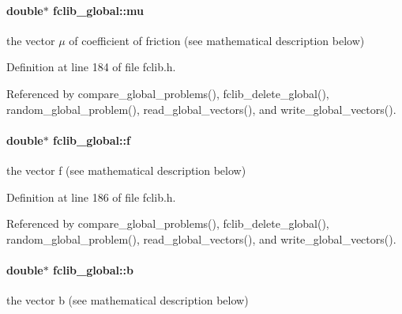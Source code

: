 \hypertarget{structfclib__global_a99fd8c775c35a6a0e233df1f8cae181a}{}
\paragraph[{mu}]{\setlength{\rightskip}{0pt plus 5cm}double$\ast$ fclib\+\_\+global\+::mu}\label{structfclib__global_a99fd8c775c35a6a0e233df1f8cae181a}


the vector $\mu$ of coefficient of friction (see mathematical description below) 



Definition at line 184 of file fclib.\+h.



Referenced by compare\+\_\+global\+\_\+problems(), fclib\+\_\+delete\+\_\+global(), random\+\_\+global\+\_\+problem(), read\+\_\+global\+\_\+vectors(), and write\+\_\+global\+\_\+vectors().

\hypertarget{structfclib__global_a6d5d0d1f9169b886eb3d3aca0632e8a9}{}
\paragraph[{f}]{\setlength{\rightskip}{0pt plus 5cm}double$\ast$ fclib\+\_\+global\+::f}\label{structfclib__global_a6d5d0d1f9169b886eb3d3aca0632e8a9}


the vector f (see mathematical description below) 



Definition at line 186 of file fclib.\+h.



Referenced by compare\+\_\+global\+\_\+problems(), fclib\+\_\+delete\+\_\+global(), random\+\_\+global\+\_\+problem(), read\+\_\+global\+\_\+vectors(), and write\+\_\+global\+\_\+vectors().

\hypertarget{structfclib__global_a1badf3df92b120566a2ee3c42194972f}{}
\paragraph[{b}]{\setlength{\rightskip}{0pt plus 5cm}double$\ast$ fclib\+\_\+global\+::b}\label{structfclib__global_a1badf3df92b120566a2ee3c42194972f}


the vector b (see mathematical description below) 



